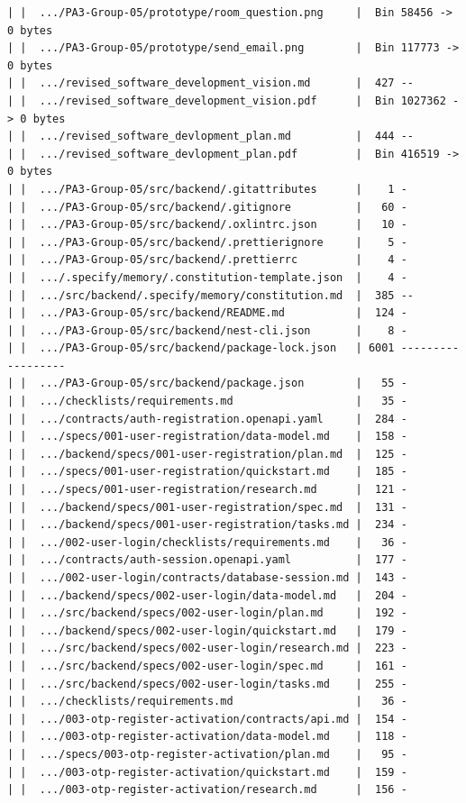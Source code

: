\documentclass[12pt]{article}
\begin{document}
\begin{lstlisting}[numbers=none,breaklines=true]
| |  .../PA3-Group-05/prototype/room_question.png     |  Bin 58456 -> 0 bytes
| |  .../PA3-Group-05/prototype/send_email.png        |  Bin 117773 -> 0 bytes
| |  .../revised_software_development_vision.md       |  427 --
| |  .../revised_software_development_vision.pdf      |  Bin 1027362 -> 0 bytes
| |  .../revised_software_devlopment_plan.md          |  444 --
| |  .../revised_software_devlopment_plan.pdf         |  Bin 416519 -> 0 bytes
| |  .../PA3-Group-05/src/backend/.gitattributes      |    1 -
| |  .../PA3-Group-05/src/backend/.gitignore          |   60 -
| |  .../PA3-Group-05/src/backend/.oxlintrc.json      |   10 -
| |  .../PA3-Group-05/src/backend/.prettierignore     |    5 -
| |  .../PA3-Group-05/src/backend/.prettierrc         |    4 -
| |  .../.specify/memory/.constitution-template.json  |    4 -
| |  .../src/backend/.specify/memory/constitution.md  |  385 --
| |  .../PA3-Group-05/src/backend/README.md           |  124 -
| |  .../PA3-Group-05/src/backend/nest-cli.json       |    8 -
| |  .../PA3-Group-05/src/backend/package-lock.json   | 6001 ------------------
| |  .../PA3-Group-05/src/backend/package.json        |   55 -
| |  .../checklists/requirements.md                   |   35 -
| |  .../contracts/auth-registration.openapi.yaml     |  284 -
| |  .../specs/001-user-registration/data-model.md    |  158 -
| |  .../backend/specs/001-user-registration/plan.md  |  125 -
| |  .../specs/001-user-registration/quickstart.md    |  185 -
| |  .../specs/001-user-registration/research.md      |  121 -
| |  .../backend/specs/001-user-registration/spec.md  |  131 -
| |  .../backend/specs/001-user-registration/tasks.md |  234 -
| |  .../002-user-login/checklists/requirements.md    |   36 -
| |  .../contracts/auth-session.openapi.yaml          |  177 -
| |  .../002-user-login/contracts/database-session.md |  143 -
| |  .../backend/specs/002-user-login/data-model.md   |  204 -
| |  .../src/backend/specs/002-user-login/plan.md     |  192 -
| |  .../backend/specs/002-user-login/quickstart.md   |  179 -
| |  .../src/backend/specs/002-user-login/research.md |  223 -
| |  .../src/backend/specs/002-user-login/spec.md     |  161 -
| |  .../src/backend/specs/002-user-login/tasks.md    |  255 -
| |  .../checklists/requirements.md                   |   36 -
| |  .../003-otp-register-activation/contracts/api.md |  154 -
| |  .../003-otp-register-activation/data-model.md    |  118 -
| |  .../specs/003-otp-register-activation/plan.md    |   95 -
| |  .../003-otp-register-activation/quickstart.md    |  159 -
| |  .../003-otp-register-activation/research.md      |  156 -

\end{lstlisting}
\end{document}
